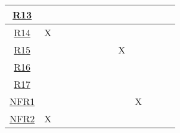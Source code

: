 \documentclass[12pt, titlepage]{article}
\begin{document}
\begin{table}[H]
\begin{tabular}{|c|cccccccccccc|}
\hyperref[R13]{R13} & \multicolumn{1}{c|}{}  & \multicolumn{1}{c|}{}  & \multicolumn{1}{c|}{}
& \multicolumn{1}{c|}{}  & \multicolumn{1}{c|}{}  & \multicolumn{1}{c|}{}
& \multicolumn{1}{c|}{}  & \multicolumn{1}{c|}{}  & \multicolumn{1}{c|}{}
& \multicolumn{1}{c|}{}   & \multicolumn{1}{c|}{}   &    \\ \hline

\hyperref[R14]{R14} & \multicolumn{1}{c|}{X}  & \multicolumn{1}{c|}{}  & \multicolumn{1}{c|}{}
& \multicolumn{1}{c|}{}  & \multicolumn{1}{c|}{}  & \multicolumn{1}{c|}{}
& \multicolumn{1}{c|}{}  & \multicolumn{1}{c|}{}  & \multicolumn{1}{c|}{}
& \multicolumn{1}{c|}{}   & \multicolumn{1}{c|}{}   &    \\ \hline

\hyperref[R15]{R15} & \multicolumn{1}{c|}{}  & \multicolumn{1}{c|}{}  & \multicolumn{1}{c|}{}
& \multicolumn{1}{c|}{}  & \multicolumn{1}{c|}{}  & \multicolumn{1}{c|}{}
& \multicolumn{1}{c|}{}  & \multicolumn{1}{c|}{X}  & \multicolumn{1}{c|}{}
& \multicolumn{1}{c|}{}   & \multicolumn{1}{c|}{}   &    \\ \hline

\hyperref[R16]{R16} & \multicolumn{1}{c|}{}  & \multicolumn{1}{c|}{}  & \multicolumn{1}{c|}{}
& \multicolumn{1}{c|}{}  & \multicolumn{1}{c|}{}  & \multicolumn{1}{c|}{}
& \multicolumn{1}{c|}{}  & \multicolumn{1}{c|}{}  & \multicolumn{1}{c|}{}
& \multicolumn{1}{c|}{}   & \multicolumn{1}{c|}{}   &    \\ \hline

\hyperref[R17]{R17} & \multicolumn{1}{c|}{}  & \multicolumn{1}{c|}{}  & \multicolumn{1}{c|}{}
& \multicolumn{1}{c|}{}  & \multicolumn{1}{c|}{}  & \multicolumn{1}{c|}{}
& \multicolumn{1}{c|}{}  & \multicolumn{1}{c|}{}  & \multicolumn{1}{c|}{}
& \multicolumn{1}{c|}{}   & \multicolumn{1}{c|}{}   &    \\ \hline

\hyperref[NFR1]{NFR1} & \multicolumn{1}{c|}{}  & \multicolumn{1}{c|}{}  & \multicolumn{1}{c|}{}
& \multicolumn{1}{c|}{}  & \multicolumn{1}{c|}{}  & \multicolumn{1}{c|}{}
& \multicolumn{1}{c|}{}  & \multicolumn{1}{c|}{}  & \multicolumn{1}{c|}{X}
& \multicolumn{1}{c|}{}   & \multicolumn{1}{c|}{}   &    \\ \hline

\hyperref[NFR2]{NFR2} & \multicolumn{1}{c|}{X}  & \multicolumn{1}{c|}{}  & \multicolumn{1}{c|}{}
& \multicolumn{1}{c|}{}  & \multicolumn{1}{c|}{}  & \multicolumn{1}{c|}{}
& \multicolumn{1}{c|}{}  & \multicolumn{1}{c|}{}  & \multicolumn{1}{c|}{}
& \multicolumn{1}{c|}{}   & \multicolumn{1}{c|}{}   &    \\ \hline


\end{tabular}
\end{table}
\end{document}
